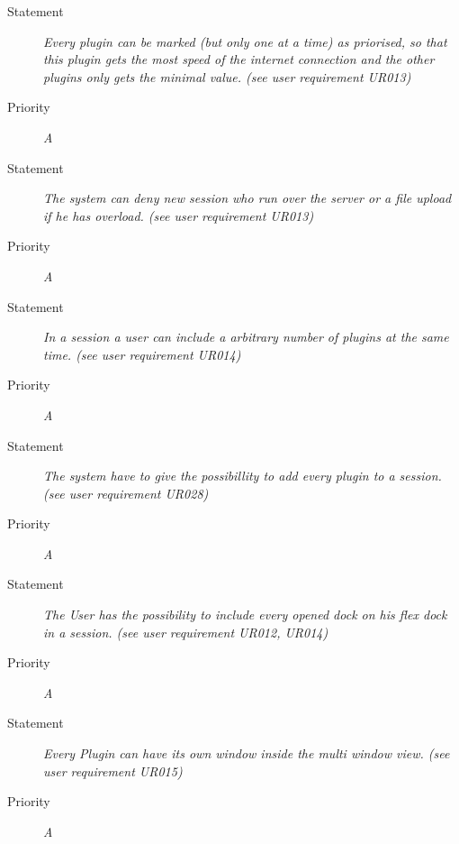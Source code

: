 \FR
\begin{description}
  \item [Statement] 
    \textit{Every plugin can be marked (but only one at a time) as priorised, so that this plugin gets the most speed of the internet connection and the other plugins only gets the minimal value.
    (see user requirement UR013)}
  \item [Priority] \textit{A}
\end{description}

\FR
\begin{description}
  \item [Statement] 
    \textit{The system can deny new session who run over the server or
      a file upload if he has overload.
    (see user requirement UR013)}
  \item [Priority] \textit{A}
\end{description}

\FR
\begin{description}
  \item [Statement] 
    \textit{In a session a user can include a arbitrary number of plugins at the same time. 
    (see user requirement UR014)}
  \item [Priority] \textit{A}
\end{description}

\FR
\begin{description}
  \item [Statement] 
    \textit{The system have to give the possibillity to add every plugin to a session.
    (see user requirement UR028)}
  \item [Priority] \textit{A}
\end{description}

\FR
\begin{description}
  \item [Statement] 
    \textit{The User has the possibility to include every opened dock on his flex dock in a session.
    (see user requirement UR012, UR014)}
  \item [Priority] \textit{A}
\end{description}

\FR
\begin{description}
  \item [Statement] 
    \textit{Every Plugin can have its own window inside the multi window view.
    (see user requirement UR015)}
  \item [Priority] \textit{A}
\end{description}

